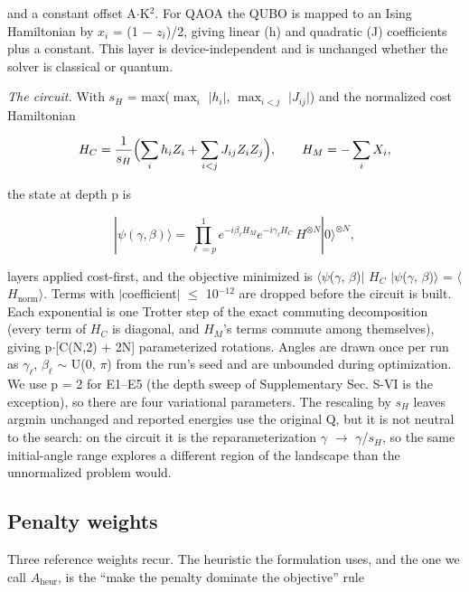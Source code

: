 \documentclass{ieeeaccess}
\begin{document}
and a constant offset A$\cdot$K$^{2}$. For QAOA the QUBO is mapped to an Ising Hamiltonian by $x_{i}$ = (1 $-$ $z_{i}$)/2, giving linear (h) and quadratic (J) coefficients plus a constant. This layer is device-independent and is unchanged whether the solver is classical or quantum.


\textit{The circuit.} With $s_{H}$ = max($\max_{i}$ $|$$h_{i}$$|$, $\max_{i<j}$ $|$$J_{ij}$$|$) and the normalized cost Hamiltonian


\begin{equation*}
H_C = \frac{1}{s_H}\Bigl(\sum_i h_i Z_i + \sum_{i<j} J_{ij} Z_i Z_j\Bigr),\qquad H_M = -\sum_i X_i,
\end{equation*}


the state at depth p is


\begin{equation*}
|\psi(\gamma,\beta)\rangle = \prod_{\ell=p}^{1} e^{-i\beta_\ell H_M} e^{-i\gamma_\ell H_C}\, H^{\otimes N}|0\rangle^{\otimes N},
\end{equation*}


layers applied cost-first, and the objective minimized is $\langle$$\psi$($\gamma$, $\beta$)$|$ $H_{C}$ $|$$\psi$($\gamma$, $\beta$)$\rangle$ = $\langle$$H_{\mathrm{norm}}$$\rangle$. Terms with $|$coefficient$|$ $\leq$ 10$^{-12}$ are dropped before the circuit is built. Each exponential is one Trotter step of the exact commuting decomposition (every term of $H_{C}$ is diagonal, and $H_{M}$'s terms commute among themselves), giving p$\cdot$[C(N,2) + 2N] parameterized rotations. Angles are drawn once per run as $\gamma_{\ell}$, $\beta_{\ell}$ $\sim$ U(0, $\pi$) from the run's seed and are unbounded during optimization. We use p = 2 for E1--E5 (the depth sweep of Supplementary Sec. S-VI is the exception), so there are four variational parameters. The rescaling by $s_{H}$ leaves argmin unchanged and reported energies use the original Q, but it is not neutral to the search: on the circuit it is the reparameterization $\gamma$ $\rightarrow$ $\gamma$/$s_{H}$, so the same initial-angle range explores a different region of the landscape than the unnormalized problem would.


\subsection{Penalty weights}


Three reference weights recur. The heuristic the formulation uses, and the one we call $A_{\mathrm{heur}}$, is the ``make the penalty dominate the objective'' rule
\end{document}
